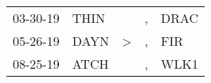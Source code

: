 \begin{supertabular}{p{0.07\textwidth}p{0.06\textwidth}p{0.02\textwidth}p{0.02\textwidth}p{0.06\textwidth}}
 03-30-19\textsuperscript{} &  THIN\textsuperscript{} &               &  , &  DRAC\textsuperscript{} \\
 05-26-19\textsuperscript{} &  DAYN\textsuperscript{} &  \textgreater &  , &   FIR\textsuperscript{} \\
 08-25-19\textsuperscript{} &  ATCH\textsuperscript{} &               &  , &  WLK1\textsuperscript{} \\
\end{supertabular}
